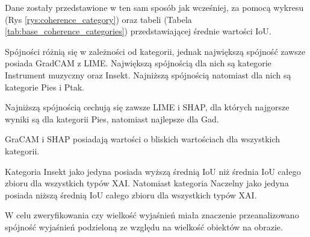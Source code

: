 Dane zostały przedstawione w ten sam sposób jak wcześniej, za pomocą wykresu (Rys \ref{rys:coherence_category}) oraz tabeli (Tabela \ref{tab:base_coherence_categories}) przedstawiającej średnie wartości IoU.

Spójności różnią się w zależności od kategorii, jednak największą spójność zawsze posiada GradCAM z LIME.
Największą spójnością dla nich są kategorie Instrument muzyczny oraz Insekt.
Najniższą spójnością natomiast dla nich są kategorie Pies i Ptak.

Najniższą spójnością cechują się zawsze LIME i SHAP, dla których najgorsze wyniki są dla kategorii Pies, natomiast najlepsze dla Gad.

GraCAM i SHAP posiadają wartości o bliskich wartościach dla wszystkich kategorii.

Kategoria Insekt jako jedyna posiada wyższą średnią IoU niż średnia IoU całego zbioru dla wszystkich typów XAI.
Natomiast kategoria Naczelny jako jedyna posiada niższą średnią IoU całego zbioru dla wszystkich typów XAI.

\vspace{1cm}
W celu zweryfikowania czy wielkość wyjaśnień miała znaczenie przeanalizowano spójność wyjaśnień podzieloną ze względu na wielkość obiektów na obrazie.

